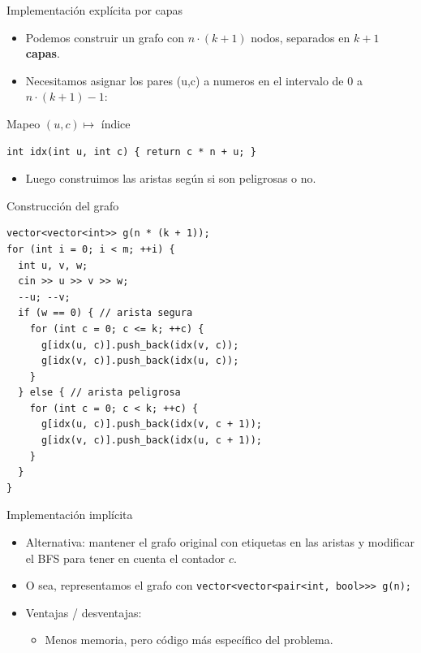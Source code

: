 \documentclass[aspectratio=169]{beamer}
\begin{document}
\begin{frame}[fragile]{Implementación explícita por capas}
  \begin{itemize}
    \item Podemos construir un grafo con \(n \cdot (k+1)\) nodos, separados en \(k+1\) \textbf{capas}.
    \item Necesitamos asignar los pares (u,c) a numeros en el intervalo de \( 0 \) a \(n \cdot (k+1) - 1\):
  \end{itemize}
  \begin{block}{Mapeo \((u, c) \mapsto\) índice}
  \begin{lstlisting}[style=customc]
int idx(int u, int c) { return c * n + u; }\end{lstlisting}
  \end{block}
  \begin{itemize}
    \item Luego construimos las aristas según si son peligrosas o no.
  \end{itemize}
\end{frame}

\begin{frame}[fragile]
  \begin{block}{Construcción del grafo}
  \begin{lstlisting}[style=customc]
vector<vector<int>> g(n * (k + 1));
for (int i = 0; i < m; ++i) {
  int u, v, w;
  cin >> u >> v >> w;
  --u; --v;
  if (w == 0) { // arista segura
    for (int c = 0; c <= k; ++c) {
      g[idx(u, c)].push_back(idx(v, c));
      g[idx(v, c)].push_back(idx(u, c));
    }
  } else { // arista peligrosa
    for (int c = 0; c < k; ++c) {
      g[idx(u, c)].push_back(idx(v, c + 1));
      g[idx(v, c)].push_back(idx(u, c + 1));
    }
  }
}
  \end{lstlisting}
  \end{block}
\end{frame}

\begin{frame}[fragile]{Implementación implícita}
  \begin{itemize}
    \item Alternativa: mantener el grafo original con etiquetas en las aristas y modificar el BFS para tener en cuenta el contador \(c\).
    \item O sea, representamos el grafo con \texttt{vector<vector<pair<int, bool>>> g(n);}
    \item Ventajas / desventajas:
      \begin{itemize}
        \item Menos memoria, pero código más específico del problema.
      \end{itemize}
  \end{itemize}

\end{frame}
\end{document}
